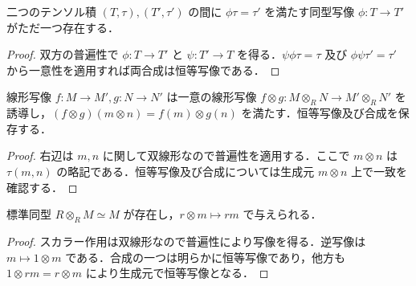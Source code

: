 \begin{prop}[テンソル積の一意性]
二つのテンソル積 $(T,\tau),(T',\tau')$ の間に $\phi\tau=\tau'$ を満たす同型写像 $\phi:T\to T'$ がただ一つ存在する．
\end{prop}
\begin{proof}
双方の普遍性で $\phi:T\to T'$ と $\psi:T'\to T$ を得る．$\psi\phi\tau=\tau$ 及び $\phi\psi\tau'=\tau'$ から一意性を適用すれば両合成は恒等写像である．
\end{proof}
\begin{prop}[テンソル積の函手性]
線形写像 $f:M\to M',g:N\to N'$ は一意の線形写像 $f\otimes g:M\otimes_R N\to M'\otimes_R N'$ を誘導し，$(f\otimes g)(m\otimes n)=f(m)\otimes g(n)$ を満たす．恒等写像及び合成を保存する．
\end{prop}
\begin{proof}
右辺は $m,n$ に関して双線形なので普遍性を適用する．ここで $m\otimes n$ は $\tau(m,n)$ の略記である．恒等写像及び合成については生成元 $m\otimes n$ 上で一致を確認する．
\end{proof}
\begin{prop}[テンソル積と係数環]
標準同型 $R\otimes_R M\simeq M$ が存在し，$r\otimes m\mapsto rm$ で与えられる．
\end{prop}
\begin{proof}
スカラー作用は双線形なので普遍性により写像を得る．逆写像は $m\mapsto1\otimes m$ である．合成の一つは明らかに恒等写像であり，他方も $1\otimes rm=r\otimes m$ により生成元で恒等写像となる．
\end{proof}
